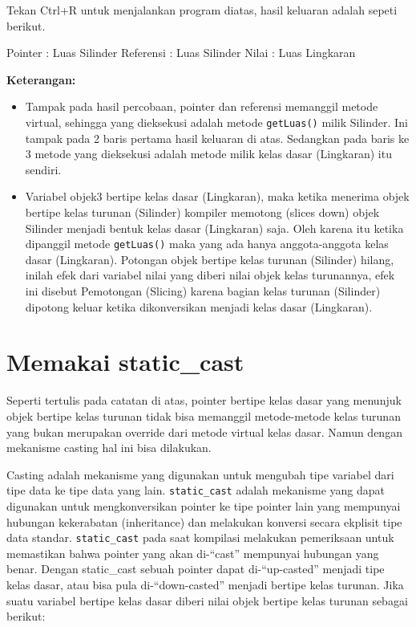 Tekan Ctrl+R untuk menjalankan program diatas, hasil keluaran adalah
sepeti berikut.

\begin{lcverbatim}
Pointer : Luas Silinder
Referensi : Luas Silinder
Nilai : Luas Lingkaran
\end{lcverbatim}

\textbf{Keterangan:}

\begin{itemize}
\tightlist
\item
  Tampak pada hasil percobaan, pointer dan referensi memanggil metode
  virtual, sehingga yang dieksekusi adalah metode \texttt{getLuas()}
  milik Silinder. Ini tampak pada 2 baris pertama hasil keluaran di
  atas. Sedangkan pada baris ke 3 metode yang dieksekusi adalah metode
  milik kelas dasar (Lingkaran) itu sendiri.
\item
  Variabel objek3 bertipe kelas dasar (Lingkaran), maka ketika menerima
  objek bertipe kelas turunan (Silinder) kompiler memotong (slices down)
  objek Silinder menjadi bentuk kelas dasar (Lingkaran) saja. Oleh
  karena itu ketika dipanggil metode \texttt{getLuas()} maka yang ada
  hanya anggota-anggota kelas dasar (Lingkaran). Potongan objek bertipe
  kelas turunan (Silinder) hilang, inilah efek dari variabel nilai yang
  diberi nilai objek kelas turunannya, efek ini disebut Pemotongan
  (Slicing) karena bagian kelas turunan (Silinder) dipotong keluar
  ketika dikonversikan menjadi kelas dasar (Lingkaran).
\end{itemize}

\section{Memakai static\_cast}\label{memakai-staticux5fcast}

Seperti tertulis pada catatan di atas, pointer bertipe kelas dasar yang
menunjuk objek bertipe kelas turunan tidak bisa memanggil metode-metode
kelas turunan yang bukan merupakan override dari metode virtual kelas
dasar. Namun dengan mekanisme casting hal ini bisa dilakukan.

Casting adalah mekanisme yang digunakan untuk mengubah tipe variabel
dari tipe data ke tipe data yang lain. \texttt{static\_cast} adalah
mekanisme yang dapat digunakan untuk mengkonversikan pointer ke tipe
pointer lain yang mempunyai hubungan kekerabatan (inheritance) dan
melakukan konversi secara ekplisit tipe data standar.
\texttt{static\_cast} pada saat kompilasi melakukan pemeriksaan untuk
memastikan bahwa pointer yang akan di-``cast'' mempunyai hubungan yang
benar. Dengan static\_cast sebuah pointer dapat di-``up-casted'' menjadi
tipe kelas dasar, atau bisa pula di-``down-casted'' menjadi bertipe
kelas turunan. Jika suatu variabel bertipe kelas dasar diberi nilai
objek bertipe kelas turunan sebagai berikut:

